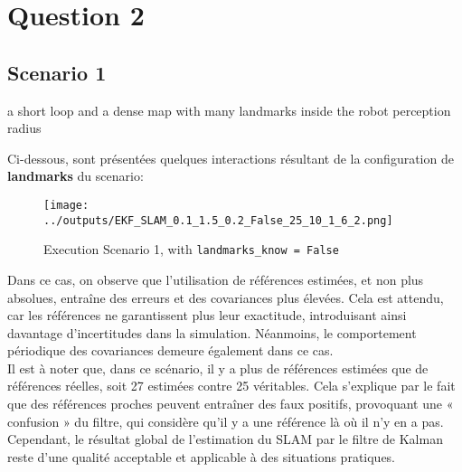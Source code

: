 \documentclass[../CSC_5RO12_TA_TP4.tex]{subfiles}
\begin{document}
\section{Question 2}
\subsection{Scenario 1}
\begin{definition}
    a short loop and a dense map with many landmarks inside the robot perception radius
\end{definition}
\noindent Ci-dessous, sont présentées quelques interactions résultant de la configuration de \textbf{landmarks} du scenario:
\begin{figure}[H]
    \centering
	\texttt{[image: ../outputs/EKF\_SLAM\_0.1\_1.5\_0.2\_False\_25\_10\_1\_6\_2.png]}
	\caption{Execution Scenario 1, with \texttt{landmarks\_know = False}}
	\label{}
\end{figure}
\noindent Dans ce cas, on observe que l'utilisation de références estimées, et non plus absolues, entraîne des erreurs et des covariances plus élevées. Cela est attendu, car les références ne garantissent plus leur exactitude, introduisant ainsi davantage d'incertitudes dans la simulation. Néanmoins, le comportement périodique des covariances demeure également dans ce cas.\\

\noindent Il est à noter que, dans ce scénario, il y a plus de références estimées que de références réelles, soit 27 estimées contre 25 véritables. Cela s'explique par le fait que des références proches peuvent entraîner des faux positifs, provoquant une « confusion » du filtre, qui considère qu'il y a une référence là où il n'y en a pas.\\

\noindent Cependant, le résultat global de l'estimation du SLAM par le filtre de Kalman reste d'une qualité acceptable et applicable à des situations pratiques.
\end{document}

